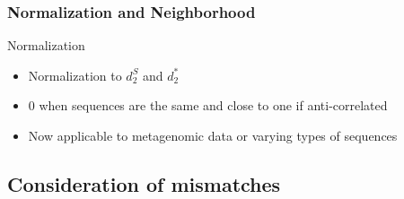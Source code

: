 \documentclass{beamer}
\begin{document}
\begin{frame}
\frametitle{Normalization and Neighborhood}
\begin{block}{Normalization}
	\begin{itemize}
		\item Normalization to $d_2^S$ and $d_2^*$
		\item 0 when sequences are the same and close to one if anti-correlated
		\item Now applicable to metagenomic data or varying types of sequences
	\end{itemize}
\end{block}
\subsection{Consideration of mismatches}
\end{frame}

\end{document}
